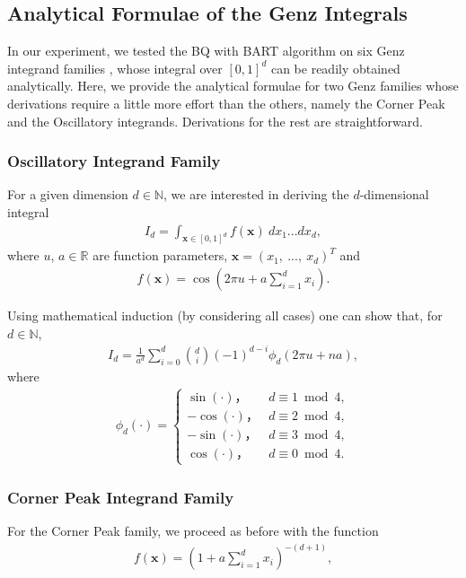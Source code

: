 \subsection*{Analytical Formulae of the Genz Integrals}
In our experiment, we tested the BQ with BART algorithm on six Genz integrand families \cite{Genz}, whose integral over $[0, 1]^{d}$ can be readily obtained analytically. Here, we provide the analytical formulae for two Genz families whose derivations require a little more effort than the others, namely the Corner Peak and the Oscillatory integrands. Derivations for the rest are straightforward.  

\subsubsection*{Oscillatory Integrand Family}
For a given dimension $d \in \mathbb{N}$, we are interested in deriving the $d$-dimensional integral 
\begin{align}
    I_d = \int_{\mathbf{x} \in [0, 1]^{d}} f(\mathbf{x}) \ dx_1 ... dx_d , 
\end{align}
where $u$, $a \in \mathbb{R}$ are function parameters, $\mathbf{x} = (x_1, \ ..., \ x_d)^{T}$ and 
\begin{align}
    f(\mathbf{x}) = \cos(2\pi u + a\sum_{i = 1}^{d}x_{i}).
\end{align}

Using mathematical induction (by considering all cases) one can show that, for $d \in \mathbb{N}$, 
\begin{align}
    I_{d} = \frac{1}{a^{d}} \sum_{i = 0}^{d} {d \choose i} (-1)^{d - i} \phi_d(2\pi u + na) ,
\end{align}
where 
\begin{align}
    \phi_d(\cdot) 
    =
    \begin{cases}
    \sin(\cdot) ， & d \equiv 1 \bmod 4 ,\\
    -\cos(\cdot) ， & d \equiv 2 \bmod 4 ,\\
    -\sin(\cdot) ， & d \equiv 3 \bmod 4 ,\\
    \cos(\cdot) ， & d \equiv 0 \bmod 4 .
    \end{cases}
\end{align}

\subsubsection*{Corner Peak Integrand Family}
For the Corner Peak family, we proceed as before with the function
\begin{align}
    f(\mathbf{x}) = \left( 1 + a\sum_{i=1}^{d}x_{i} \right)^{-(d + 1)} ,
\end{align}


